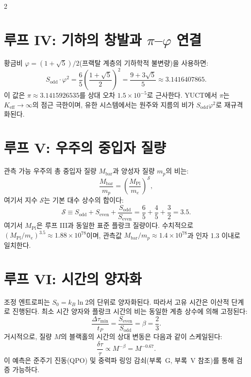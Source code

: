\documentclass[12pt,a4paper]{article}
\newcommand{\Keff}{K_{\mathrm{eff}}}
\begin{document}
	\begin{multicols}{2}
		\section{루프 IV: 기하의 창발과 \(\pi\)–\(\varphi\) 연결}
		
		황금비 \(\varphi = (1+\sqrt{5})/2\)(프랙탈 계층의 기하학적 불변량)을 사용하면:
		\begin{equation}
			S_{\mathrm{odd}} \cdot \varphi^2 = \frac{6}{5} \left( \frac{1+\sqrt{5}}{2} \right)^2 = \frac{9+3\sqrt{5}}{5} \approx 3.1416407865.
		\end{equation}
		이 값은 \(\pi \approx 3.1415926535\)를 상대 오차 \(1.5 \times 10^{-5}\)로 근사한다. YUCT에서 \(\pi\)는 \(\Keff \to \infty\)의 점근 극한이며, 유한 시스템에서는 원주와 지름의 비가 \(S_{\mathrm{odd}}\varphi^2\)로 재규격화된다.
		
		\section{루프 V: 우주의 중입자 질량}
		
		관측 가능 우주의 총 중입자 질량 \(M_{\mathrm{bar}}\)과 양성자 질량 \(m_p\)의 비는:
		\begin{equation}
			\frac{M_{\mathrm{bar}}}{m_p} = \left( \frac{M_{\mathrm{Pl}}}{m_e} \right)^{\mathcal{S}},
		\end{equation}
		여기서 지수 \(\mathcal{S}\)는 기본 대수 상수의 합이다:
		\begin{equation}
			\mathcal{S} \equiv S_{\mathrm{odd}} + S_{\mathrm{even}} + \frac{S_{\mathrm{odd}}}{S_{\mathrm{even}}} = \frac{6}{5} + \frac{4}{5} + \frac{3}{2} = 3.5.
		\end{equation}
		여기서 \(M_{\mathrm{Pl}}\)은 루프 III과 동일한 표준 플랑크 질량이다. 수치적으로 \((M_{\mathrm{Pl}}/m_e)^{3.5} \approx 1.88 \times 10^{78}\)이며, 관측값 \(M_{\mathrm{bar}}/m_p \approx 1.4 \times 10^{78}\)과 인자 1.3 이내로 일치한다.
		
		\section{루프 VI: 시간의 양자화}
		
		조정 엔트로피는 \(S_0 = k_B \ln 2\)의 단위로 양자화된다. 따라서 고유 시간은 이산적 단계로 진행된다. 최소 시간 양자와 플랑크 시간의 비는 동일한 계층 상수에 의해 고정된다:
		\begin{equation}
			\boxed{\frac{\Delta \tau_{\min}}{t_P} = \frac{S_{\mathrm{even}}}{S_{\mathrm{odd}}} = \beta = \frac{2}{3}}.
		\end{equation}
		거시적으로, 질량 \(M\)의 블랙홀의 시간의 상대 변동은 다음과 같이 스케일된다:
		\begin{equation}
			\frac{\delta \tau}{\tau} \propto M^{-\beta} = M^{-0.67}.
		\end{equation}
		이 예측은 준주기 진동(QPO) 및 중력파 링잉 감쇠(부록~G, 부록~V 참조)를 통해 검증 가능하다.
		

\end{multicols}
\end{document}
